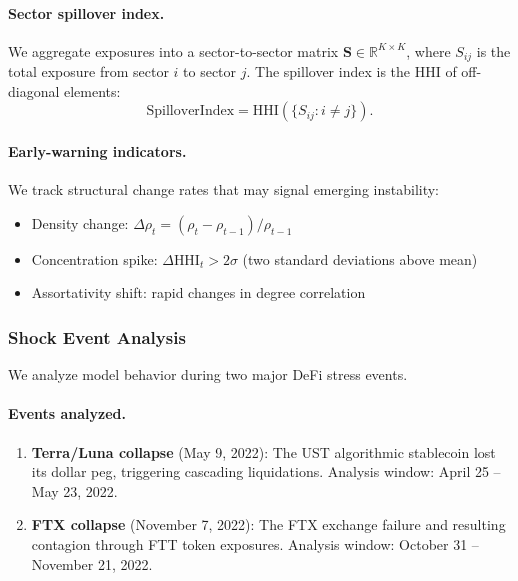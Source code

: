 \paragraph{Sector spillover index.}
We aggregate exposures into a sector-to-sector matrix $\mathbf{S} \in \mathbb{R}^{K \times K}$, where $S_{ij}$ is the total exposure from sector $i$ to sector $j$. The spillover index is the HHI of off-diagonal elements:
\begin{equation}
\text{SpilloverIndex} = \text{HHI}\left(\{S_{ij} : i \neq j\}\right).
\end{equation}

\paragraph{Early-warning indicators.}
We track structural change rates that may signal emerging instability:
\begin{itemize}
  \item Density change: $\Delta\rho_t = (\rho_t - \rho_{t-1})/\rho_{t-1}$
  \item Concentration spike: $\Delta\text{HHI}_t > 2\sigma$ (two standard deviations above mean)
  \item Assortativity shift: rapid changes in degree correlation
\end{itemize}

\subsubsection{Shock Event Analysis}
\label{subsubsec:shock-events}

We analyze model behavior during two major DeFi stress events.

\paragraph{Events analyzed.}
\begin{enumerate}
  \item \textbf{Terra/Luna collapse} (May 9, 2022): The UST algorithmic stablecoin lost its dollar peg, triggering cascading liquidations. Analysis window: April 25 -- May 23, 2022.
  \item \textbf{FTX collapse} (November 7, 2022): The FTX exchange failure and resulting contagion through FTT token exposures. Analysis window: October 31 -- November 21, 2022.
\end{enumerate}

